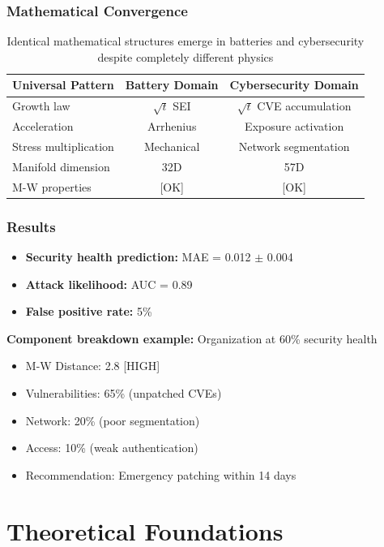 \documentclass[11pt,a4paper]{article}
\begin{document}
\subsubsection{Mathematical Convergence}

\begin{table}[h]
\centering
\begin{tabular}{lcc}
\toprule
\textbf{Universal Pattern} & \textbf{Battery Domain} & \textbf{Cybersecurity Domain} \\
\midrule
Growth law & $\sqrt{t}$ SEI & $\sqrt{t}$ CVE accumulation \\
Acceleration & Arrhenius & Exposure activation \\
Stress multiplication & Mechanical & Network segmentation \\
Manifold dimension & 32D & 57D \\
M-W properties & [OK] & [OK] \\
\bottomrule
\end{tabular}
\caption{Identical mathematical structures emerge in batteries and cybersecurity despite completely different physics}
\end{table}

\subsubsection{Results}

\begin{itemize}
\item \textbf{Security health prediction:} MAE = 0.012 $\pm$ 0.004
\item \textbf{Attack likelihood:} AUC = 0.89
\item \textbf{False positive rate:} 5\%
\end{itemize}

\textbf{Component breakdown example:} Organization at 60\% security health
\begin{itemize}
\item M-W Distance: 2.8 [HIGH]
\item Vulnerabilities: 65\% (unpatched CVEs)
\item Network: 20\% (poor segmentation)
\item Access: 10\% (weak authentication)
\item Recommendation: Emergency patching within 14 days
\end{itemize}

\section{Theoretical Foundations}
\end{document}

